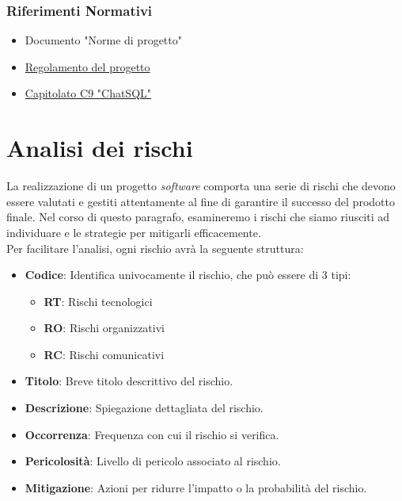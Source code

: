 \documentclass[5pt]{article}
\begin{document}
\subsubsection{Riferimenti Normativi}
\begin{itemize}
      \item Documento "Norme di progetto"
      \item \href{https://www.math.unipd.it/~tullio/IS-1/2023/Dispense/PD2.pdf}{Regolamento del progetto}
      \item \href{https://www.math.unipd.it/~tullio/IS-1/2023/Progetto/C9.pdf}{Capitolato C9 "ChatSQL"} 
\end{itemize}

\section{Analisi dei rischi}
La realizzazione di un progetto \textit{software} comporta una serie di rischi che devono essere valutati e gestiti attentamente al fine di garantire il successo del prodotto finale. Nel corso di questo paragrafo, esamineremo i rischi che siamo riusciti ad individuare e le strategie per mitigarli efficacemente. \\[1\baselineskip]
Per facilitare l'analisi, ogni rischio avrà la seguente struttura:
\begin{itemize}
  \item \textbf{Codice}: Identifica univocamente il rischio, che può essere di 3 tipi:
      \begin{itemize}
      \item \textbf{RT}: Rischi tecnologici
      \item \textbf{RO}: Rischi organizzativi
      \item \textbf{RC}: Rischi comunicativi
      \end{itemize}
  \item \textbf{Titolo}: Breve titolo descrittivo del rischio.
  \item \textbf{Descrizione}: Spiegazione dettagliata del rischio.
  \item \textbf{Occorrenza}: Frequenza con cui il rischio si verifica.
  \item \textbf{Pericolosità}: Livello di pericolo associato al rischio.
  \item \textbf{Mitigazione}: Azioni per ridurre l'impatto o la probabilità del rischio.
\end{itemize}
\end{document}
